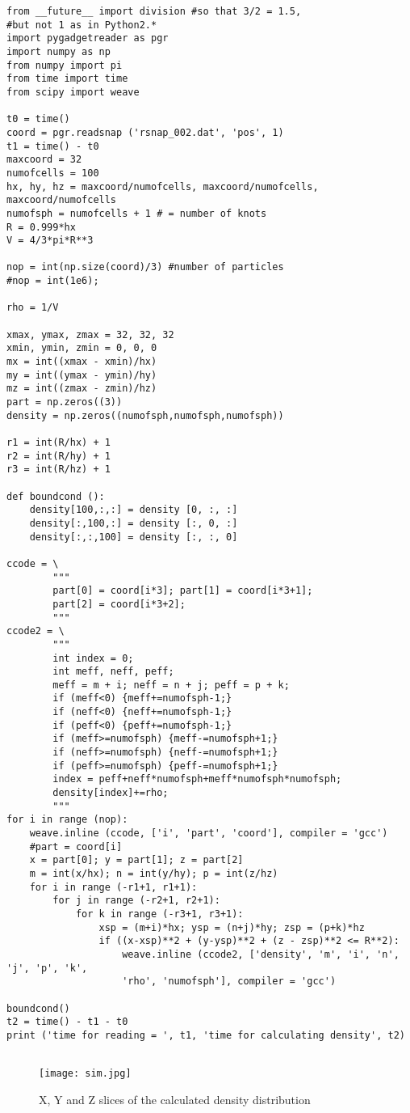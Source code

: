 \documentclass[11pt]{article}
\begin{document}
\begin{lstlisting}
from __future__ import division #so that 3/2 = 1.5, 
#but not 1 as in Python2.* 
import pygadgetreader as pgr
import numpy as np
from numpy import pi
from time import time
from scipy import weave

t0 = time()
coord = pgr.readsnap ('rsnap_002.dat', 'pos', 1) 
t1 = time() - t0
maxcoord = 32
numofcells = 100
hx, hy, hz = maxcoord/numofcells, maxcoord/numofcells, maxcoord/numofcells
numofsph = numofcells + 1 # = number of knots
R = 0.999*hx
V = 4/3*pi*R**3 

nop = int(np.size(coord)/3) #number of particles
#nop = int(1e6);

rho = 1/V

xmax, ymax, zmax = 32, 32, 32
xmin, ymin, zmin = 0, 0, 0
mx = int((xmax - xmin)/hx)
my = int((ymax - ymin)/hy)
mz = int((zmax - zmin)/hz)
part = np.zeros((3))
density = np.zeros((numofsph,numofsph,numofsph))

r1 = int(R/hx) + 1
r2 = int(R/hy) + 1
r3 = int(R/hz) + 1

def boundcond ():
    density[100,:,:] = density [0, :, :]
    density[:,100,:] = density [:, 0, :]
    density[:,:,100] = density [:, :, 0]

ccode = \
        """
        part[0] = coord[i*3]; part[1] = coord[i*3+1];
        part[2] = coord[i*3+2];
        """
ccode2 = \
        """
        int index = 0;
        int meff, neff, peff;
        meff = m + i; neff = n + j; peff = p + k;
        if (meff<0) {meff+=numofsph-1;}
        if (neff<0) {neff+=numofsph-1;}
        if (peff<0) {peff+=numofsph-1;}
        if (meff>=numofsph) {meff-=numofsph+1;}
        if (neff>=numofsph) {neff-=numofsph+1;}
        if (peff>=numofsph) {peff-=numofsph+1;}
        index = peff+neff*numofsph+meff*numofsph*numofsph;
        density[index]+=rho;
        """
for i in range (nop):
    weave.inline (ccode, ['i', 'part', 'coord'], compiler = 'gcc')
    #part = coord[i]
    x = part[0]; y = part[1]; z = part[2]    
    m = int(x/hx); n = int(y/hy); p = int(z/hz)
    for i in range (-r1+1, r1+1):
        for j in range (-r2+1, r2+1):
            for k in range (-r3+1, r3+1):
                xsp = (m+i)*hx; ysp = (n+j)*hy; zsp = (p+k)*hz
                if ((x-xsp)**2 + (y-ysp)**2 + (z - zsp)**2 <= R**2):
                    weave.inline (ccode2, ['density', 'm', 'i', 'n', 'j', 'p', 'k', 
                    'rho', 'numofsph'], compiler = 'gcc')
                    
boundcond()
t2 = time() - t1 - t0
print ('time for reading = ', t1, 'time for calculating density', t2)  
   
\end{lstlisting}
\begin{figure}[H]
\centering
\texttt{[image: sim.jpg]}
\caption{X, Y and Z slices of the calculated density distribution}  
\end{figure}
\end{document}
